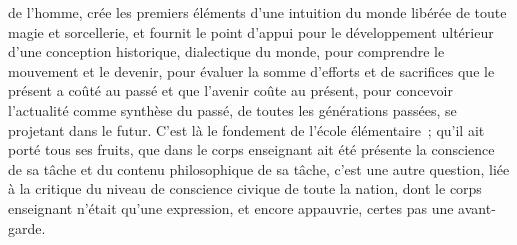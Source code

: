 \documentclass[french,twoside]{book} %
\begin{document}
de l’homme, crée les premiers éléments d’une intuition du monde libérée de toute magie et sorcellerie, et fournit le point d’appui pour le développement ultérieur d’une conception historique, dialectique du monde, pour comprendre le mouvement et le devenir, pour évaluer la somme d’efforts et de sacrifices que le présent a coûté au passé et que l’avenir coûte au présent, pour concevoir l’actualité comme synthèse du passé, de toutes les générations passées, se projetant dans le futur. C'est là le fondement de l’école élémentaire ; qu’il ait porté tous ses fruits, que dans le corps enseignant ait été présente la conscience de sa tâche et du contenu philosophique de sa tâche, c’est une autre question, liée à la critique du niveau de conscience civique de toute la nation, dont le corps enseignant n’était qu’une expression, et encore appauvrie, certes pas une avant-garde.\par
\end{document}
